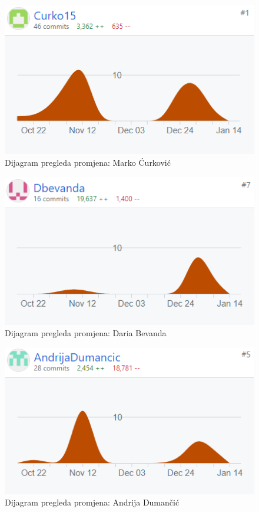 		\begin{figure}[h]
			\centering
			\includegraphics[width=0.8\linewidth]{slike/graf_curko.png}
			\caption{Dijagram pregleda promjena: Marko Ćurković}
			\label{fig:graf_curko}
		\end{figure}
		
		\begin{figure}
			\centering
			\includegraphics[width=0.8\linewidth]{slike/graf_daria.png}
			\caption{Dijagram pregleda promjena: Daria Bevanda}
			\label{fig:graf_daria}
		\end{figure}
		
		\begin{figure}
			\centering
			\includegraphics[width=0.8\linewidth]{slike/graf_duma.png}
			\caption{Dijagram pregleda promjena: Andrija Dumančić}
			\label{fig:graf_duma}
		\end{figure}
		
